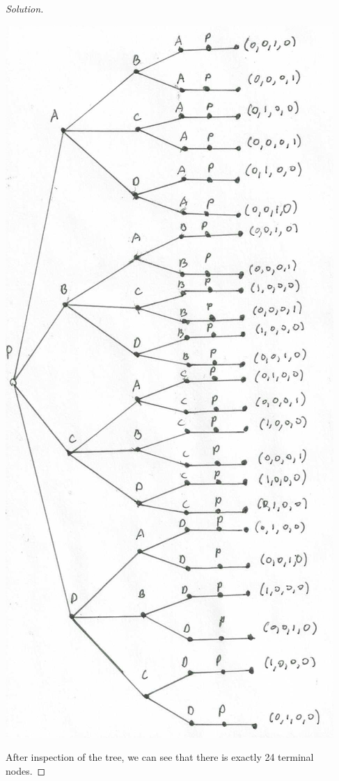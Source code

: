 \documentclass[ 12pt ]{article}
\begin{document}
\begin{enumerate}
\begin{enumerate}
\begin{enumerate}
\begin{proof}[Solution]
\begin{center}
								\includegraphics{tree3}
							\end{center}
							After inspection of the tree, we can see that there is exactly 24 terminal nodes.
						\end{proof}
					\newpage


\end{enumerate}
\end{enumerate}
\end{enumerate}
\end{document}
